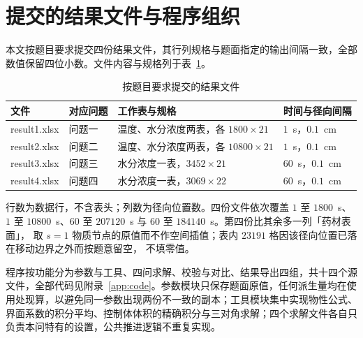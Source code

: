 \section{提交的结果文件与程序组织}

本文按题目要求提交四份结果文件，其行列规格与题面指定的输出间隔一致，全部数值保留四位小数。文件内容与规格列于表~\ref{tab:files}。

\begin{table}[H]
\centering
\caption{按题目要求提交的结果文件}\label{tab:files}
\begin{tabular}{llll}
\toprule
文件 & 对应问题 & 工作表与规格 & 时间与径向间隔 \\
\midrule
result1.xlsx & 问题一 & 温度、水分浓度两表，各 $1800\times21$ & $1$~s，$0.1$~cm \\
result2.xlsx & 问题二 & 温度、水分浓度两表，各 $10800\times21$ & $1$~s，$0.1$~cm \\
result3.xlsx & 问题三 & 水分浓度一表，$3452\times21$ & $60$~s，$0.1$~cm \\
result4.xlsx & 问题四 & 水分浓度一表，$3069\times22$ & $60$~s，$0.1$~cm \\
\bottomrule
\end{tabular}

\vspace{0.6em}
\begin{minipage}{0.94\textwidth}
\footnotesize 行数为数据行，不含表头；列数为径向位置数。四份文件依次覆盖 $1$ 至 $1800$~s、
$1$ 至 $10800$~s、$60$ 至 $207120$~s 与 $60$ 至 $184140$~s。第四份比其余多一列「药材表面」，
取 $s=1$ 物质节点的原值而不作空间插值；表内 $23191$ 格因该径向位置已落在移动边界之外而按题意留空，
不填零值。
\end{minipage}
\end{table}

程序按功能分为参数与工具、四问求解、校验与对比、结果导出四组，共十四个源文件，全部代码见附录~\ref{app:code}。参数模块只保存题面原值，任何派生量均在使用处现算，以避免同一参数出现两份不一致的副本；工具模块集中实现物性公式、界面系数的积分平均、控制体体积的精确积分与三对角求解；四个求解文件各自只负责本问特有的设置，公共推进逻辑不重复实现。

